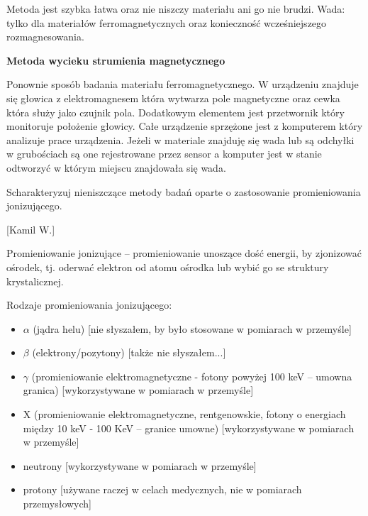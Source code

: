 \documentclass{article}
\begin{document}
\begin{enumerate}
Metoda jest szybka łatwa oraz nie niszczy materiału ani go nie brudzi.
Wada: tylko dla materiałów ferromagnetycznych oraz konieczność wcześniejszego rozmagnesowania. 


{\bf Metoda wycieku strumienia magnetycznego }


Ponownie sposób badania materiału ferromagnetycznego. W urządzeniu znajduje się głowica z elektromagnesem która wytwarza pole magnetyczne oraz cewka która służy jako czujnik pola. Dodatkowym elementem jest przetwornik który monitoruje położenie głowicy. Całe urządzenie sprzężone jest z komputerem który analizuje prace urządzenia. Jeżeli w materiale znajduję się wada lub są odchyłki w grubościach są one rejestrowane przez sensor a komputer jest w stanie odtworzyć w którym miejscu znajdowała się wada. 








{\Large \bf  \item Scharakteryzuj nieniszczące metody badań oparte o zastosowanie promieniowania
jonizującego.} [Kamil W.]

Promieniowanie jonizujące – promieniowanie unoszące dość energii, by zjonizować ośrodek, tj. oderwać elektron od atomu ośrodka lub wybić go se struktury krystalicznej.

Rodzaje promieniowania jonizującego:
\begin{itemize}
\item $\alpha$ (jądra helu) [nie słyszałem, by było stosowane w pomiarach w przemyśle]

\item $\beta$ (elektrony/pozytony) [także nie słyszałem...]

\item $\gamma$ (promieniowanie elektromagnetyczne - fotony powyżej 100 keV – umowna granica) [wykorzystywane w pomiarach w przemyśle]

\item X (promieniowanie elektromagnetyczne, rentgenowskie, fotony o energiach między 10 keV - 100 KeV – granice umowne) [wykorzystywane w pomiarach w przemyśle]

\item neutrony [wykorzystywane w pomiarach w przemyśle]

\item protony [używane raczej w celach medycznych, nie w pomiarach przemysłowych]
\end{itemize}


\end{enumerate}
\end{document}

